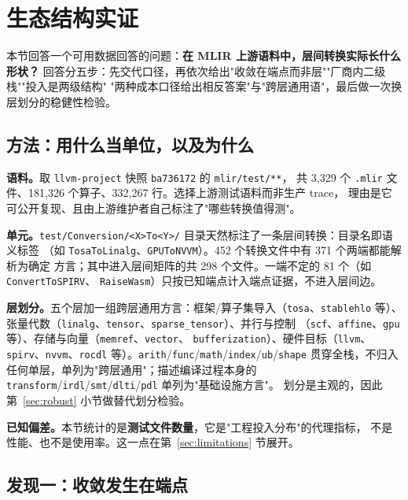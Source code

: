 
\section{生态结构实证}
\label{sec:evidence}

本节回答一个可用数据回答的问题：\textbf{在 MLIR 上游语料中，层间转换实际长什么形状？}
回答分五步：先交代口径，再依次给出"收敛在端点而非层""厂商内二级栈""投入是两级结构"
"两种成本口径给出相反答案"与"跨层通用语"，最后做一次换层划分的稳健性检验。

\subsection{方法：用什么当单位，以及为什么}

\textbf{语料。}取 \texttt{llvm-project} 快照 \texttt{ba736172} 的 \texttt{mlir/test/**}，
共 3,329 个 \texttt{.mlir} 文件、181,326 个算子、332,267 行。选择上游测试语料而非生产 trace，
理由是它可公开复现、且由上游维护者自己标注了"哪些转换值得测"。

\textbf{单元。}\texttt{test/Conversion/<X>To<Y>/} 目录天然标注了一条层间转换：目录名即语义标签
（如 \texttt{TosaToLinalg}、\texttt{GPUToNVVM}）。452 个转换文件中有 371 个两端都能解析为确定
方言；其中进入层间矩阵的共 298 个文件。一端不定的 81 个（如 \texttt{ConvertToSPIRV}、
\texttt{RaiseWasm}）只按已知端点计入端点证据，不进入层间边。

\textbf{层划分。}五个层加一组跨层通用方言：框架/算子集导入（\texttt{tosa}、\texttt{stablehlo}
等）、张量代数（\texttt{linalg}、\texttt{tensor}、\texttt{sparse\_tensor}）、并行与控制
（\texttt{scf}、\texttt{affine}、\texttt{gpu} 等）、存储与向量（\texttt{memref}、\texttt{vector}、
\texttt{bufferization}）、硬件目标（\texttt{llvm}、\texttt{spirv}、\texttt{nvvm}、\texttt{rocdl}
等）。\texttt{arith}/\texttt{func}/\texttt{math}/\texttt{index}/\texttt{ub}/\texttt{shape}
贯穿全栈，不归入任何单层，单列为"跨层通用"；描述编译过程本身的
\texttt{transform}/\texttt{irdl}/\texttt{smt}/\texttt{dlti}/\texttt{pdl} 单列为"基础设施方言"。
划分是主观的，因此第~\ref{sec:robust} 小节做替代划分检验。

\textbf{已知偏差。}本节统计的是\textbf{测试文件数量}，它是"工程投入分布"的代理指标，
不是性能、也不是使用率。这一点在第~\ref{sec:limitations} 节展开。

\subsection{发现一：收敛发生在端点}

